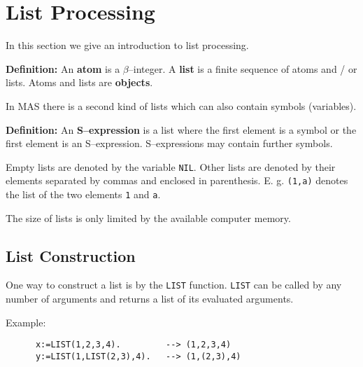 

\chapter{List Processing}

\def\cell#1#2{
\begin{minipage}{2.5cm}
\framebox[2.0cm]{\rule{0.0cm}{0.4cm}#1} \\
\framebox[2.0cm]{\rule{0.0cm}{0.4cm}#2} 
\end{minipage}
}
\def\pcell#1#2{
\begin{minipage}{2.5cm}
\makebox[2.0cm]{\rule{0.0cm}{0.4cm}#1} \\
\makebox[2.0cm]{\rule{0.0cm}{0.4cm}#2} 
\end{minipage}
}
\def\arr{$\longrightarrow$}
\def\ptr{$\bullet$}

In this section we give an introduction to 
list processing.

{\bf Definition:} An {\bf atom} is a $\beta$--integer.
A {\bf list} is a finite sequence of atoms and / or lists.
Atoms and lists are {\bf objects}.

In MAS there is a second kind of lists which can also
contain symbols (variables).

{\bf Definition:} An {\bf S--expression} is a 
list where the first element is a symbol
or the first element is an S--expression.
S--expressions may contain further symbols.

Empty lists are denoted by the variable \verb/NIL/.
Other lists are denoted by their elements
separated by commas and enclosed in parenthesis.
E. g. \verb/(1,a)/ denotes the list of the two
elements \verb/1/ and \verb/a/.

The size of lists is only limited by the available
computer memory.


\section{List Construction}

One way to construct a list is by the \verb/LIST/ function.
\verb/LIST/ can be called by any number of arguments
and returns a list of its evaluated arguments.

Example: 
\begin{verbatim}
      x:=LIST(1,2,3,4).         --> (1,2,3,4)
      y:=LIST(1,LIST(2,3),4).   --> (1,(2,3),4)
\end{verbatim}

